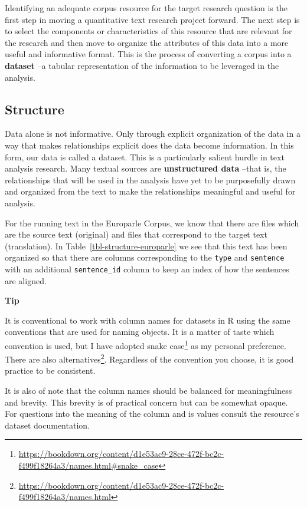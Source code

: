 \documentclass[
  letterpaper,
]{latex/krantz}
\DeclareRobustCommand{\href}[2]{#2\footnote{\url{#1}}}
\begin{document}
Identifying an adequate corpus resource for the target research question
is the first step in moving a quantitative text research project
forward. The next step is to select the components or characteristics of
this resource that are relevant for the research and then move to
organize the attributes of this data into a more useful and informative
format. This is the process of converting a corpus into a
\textbf{dataset} --a tabular representation of the
information to be leveraged in the analysis.

\hypertarget{structure-1}{%
\subsection{Structure}\label{structure-1}}

Data alone is not informative. Only through explicit organization of the
data in a way that makes relationships explicit does the data become
information. In this form, our data is called a dataset. This is a
particularly salient hurdle in text analysis research. Many textual
sources are \textbf{unstructured data} --that
is, the relationships that will be used in the analysis have yet to be
purposefully drawn and organized from the text to make the relationships
meaningful and useful for analysis.

For the running text in the Europarle Corpus, we know that there are
files which are the source text (original) and files that correspond to
the target text (translation). In Table~\ref{tbl-structure-europarle} we
see that this text has been organized so that there are columns
corresponding to the \texttt{type} and \texttt{sentence} with an
additional \texttt{sentence\_id} column to keep an index of how the
sentences are aligned.

\begin{tcolorbox}[enhanced jigsaw, left=2mm, arc=.35mm, colback=white, rightrule=.15mm, toprule=.15mm, breakable, leftrule=.75mm, opacityback=0, bottomrule=.15mm]

\textbf{ Tip}

It is conventional to work with column names for datasets in R using the
same conventions that are used for naming objects. It is a matter of
taste which convention is used, but I have adopted
\href{https://bookdown.org/content/d1e53ac9-28ce-472f-bc2c-f499f18264a3/names.html\#snake_case}{snake
case} as my personal preference. There are also
\href{https://bookdown.org/content/d1e53ac9-28ce-472f-bc2c-f499f18264a3/names.html}{alternatives}.
Regardless of the convention you choose, it is good practice to be
consistent.

It is also of note that the column names should be balanced for
meaningfulness and brevity. This brevity is of practical concern but can
be somewhat opaque. For questions into the meaning of the column and is
values consult the resource's dataset documentation.

\end{tcolorbox}
\end{document}
